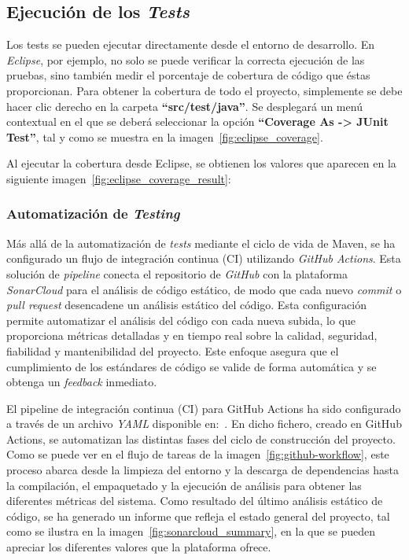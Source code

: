 \subsection{Ejecución de los \emph{Tests}}
Los tests se pueden ejecutar directamente desde el entorno de desarrollo. En \textit{Eclipse}, por ejemplo, no solo se puede verificar la correcta ejecución de las pruebas, sino también medir el porcentaje de cobertura de código que éstas proporcionan. Para obtener la cobertura de todo el proyecto, simplemente se debe hacer clic derecho en la carpeta \textbf{``src/test/java''}. Se desplegará un menú contextual en el que se deberá seleccionar la opción \textbf{``Coverage As -> JUnit Test''}, tal y como se muestra en la imagen~\ref{fig:eclipse_coverage}.


Al ejecutar la cobertura desde Eclipse, se obtienen los valores que aparecen en la siguiente imagen~\ref{fig:eclipse_coverage_result}:


\subsubsection{Automatización de \emph{Testing}}
Más allá de la automatización de \emph{tests} mediante el ciclo de vida de Maven, se ha configurado un flujo de integración continua (CI) utilizando \textit{GitHub Actions}. Esta solución de \emph{pipeline} conecta el repositorio de \textit{GitHub} con la plataforma \textit{SonarCloud} para el análisis de código estático, de modo que cada nuevo \emph{commit} o \emph{pull request} desencadene un análisis estático del código. Esta configuración permite automatizar el análisis del código con cada nueva subida, lo que proporciona métricas detalladas y en tiempo real sobre la calidad, seguridad, fiabilidad y mantenibilidad del proyecto. Este enfoque asegura que el cumplimiento de los estándares de código se valide de forma automática y se obtenga un \emph{feedback} inmediato.

El pipeline de integración continua (CI) para GitHub Actions ha sido configurado a través de un archivo \textit{YAML} disponible en:~\cite{github_action_ci}. En dicho fichero, creado en GitHub Actions, se automatizan las distintas fases del ciclo de construcción del proyecto. Como se puede ver en el flujo de tareas de la imagen~\ref{fig:github-workflow}, este proceso abarca desde la limpieza del entorno y la descarga de dependencias hasta la compilación, el empaquetado y la ejecución de análisis para obtener las diferentes métricas del sistema. Como resultado del último análisis estático de código, se ha generado un informe que refleja el estado general del proyecto, tal como se ilustra en la imagen~\ref{fig:sonarcloud_summary}, en la que se pueden apreciar los diferentes valores que la plataforma ofrece.

